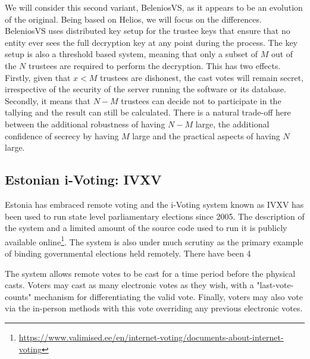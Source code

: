 We will consider this second variant, BeleniosVS, as it appears to be an evolution of the original. Being based on Helios, we will focus on the differences. BeleniosVS uses distributed key setup for the trustee keys that ensure that no entity ever sees the full decryption key at any point during the process. The key setup is also a threshold based system, meaning that only a subset of $M$ out of the $N$ trustees are required to perform the decryption. This has two effects. Firstly, given that $x < M$ trustees are dishonest, the cast votes will remain secret, irrespective of the security of the server running the software or its database. Secondly, it means that $N-M$ trustees can decide not to participate in the tallying and the result can still be calculated. There is a natural trade-off here between the additional robustness of having $N-M$ large, the additional confidence of secrecy by having $M$ large and the practical aspects of having $N$ large.



\subsection{Estonian i-Voting: IVXV}

Estonia has embraced remote voting and the i-Voting system known as IVXV has been used to run state level parliamentary elections since 2005. The description of the system and a limited amount of the source code used to run it is publicly available online\footnote{\url{https://www.valimised.ee/en/internet-voting/documents-about-internet-voting}}. The system is also under much scrutiny as the primary example of binding governmental elections held remotely. There have been 4

The system allows remote votes to be cast for a time period before the physical casts. Voters may cast as many electronic votes as they wish, with a "last-vote-counts" mechanism for differentiating the valid vote. Finally, voters may also vote via the in-person methods with this vote overriding any previous electronic votes.





